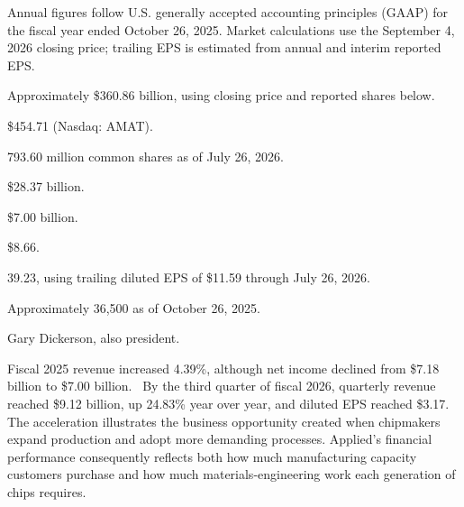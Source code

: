 \documentclass[10pt]{article}
\begin{document}
Annual figures follow U.S. generally accepted accounting principles (GAAP) for the fiscal year ended October 26, 2025. Market calculations use the September 4, 2026 closing price; trailing EPS is estimated from annual and interim reported EPS.~\cite{amat-results,amat-quarterly,amat-price}

\begin{description}[style = unboxed, leftmargin = 0pt, labelwidth = 0pt, itemsep = 0pt, parsep = 0pt, topsep = 0.3em]
    \item[Market capitalization:] Approximately \$360.86 billion, using closing price and reported shares below.
    \item[Share price:] \$454.71 (Nasdaq: AMAT).~\cite{amat-price}
    \item[Shares outstanding:] 793.60 million common shares as of July 26, 2026.~\cite{amat-quarterly}
    \item[Annual revenue:] \$28.37 billion.~\cite{amat-results}
    \item[Annual net income:] \$7.00 billion.~\cite{amat-results}
    \item[Annual diluted earnings per share:] \$8.66.~\cite{amat-results}
    \item[Price-to-earnings ratio:] 39.23, using trailing diluted EPS of \$11.59 through July 26, 2026.~\cite{amat-results,amat-quarterly}
    \item[Employees:] Approximately 36,500 as of October 26, 2025.~\cite{amat-annual}
    \item[CEO:] Gary Dickerson, also president.~\cite{amat-results}
\end{description}

Fiscal 2025 revenue increased 4.39\%, although net income declined from \$7.18 billion to \$7.00 billion.~\cite{amat-results} By the third quarter of fiscal 2026, quarterly revenue reached \$9.12 billion, up 24.83\% year over year, and diluted EPS reached \$3.17.~\cite{amat-quarterly} The acceleration illustrates the business opportunity created when chipmakers expand production and adopt more demanding processes. Applied's financial performance consequently reflects both how much manufacturing capacity customers purchase and how much materials-engineering work each generation of chips requires.
\end{document}
